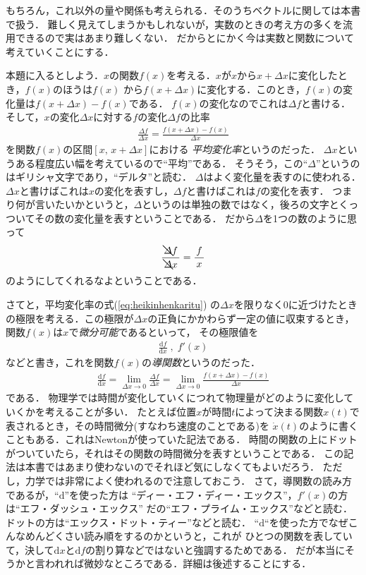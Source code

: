 もちろん，これ以外の量や関係も考えられる．そのうちベクトルに関しては本書で扱う．
難しく見えてしまうかもしれないが，実数のときの考え方の多くを流用できるので実はあまり難しくない．
だからとにかく今は実数と関数について考えていくことにする． 

本題に入るとしよう．$x$の関数$f(x)$を考える．$x$が$x$から$x + \varDelta x$に変化したとき，$f(x)$のほうは$f(x)$
から$f(x+ \varDelta x)$に変化する．このとき，$f(x)$の変化量は$f(x+\varDelta x )-f(x)$である．
$f(x)$の変化なのでこれは$\varDelta f$と書ける．
そして，$x$の変化$\varDelta x$に対する$f$の変化$\varDelta f$の比率
\begin{align}
\frac{\varDelta f}{\varDelta x} = \frac{f(x+\varDelta x)-f(x)}{\varDelta x}
\label{eq:heikinhenkaritu}
\end{align}
を関数$f(x)$の区間$[x, \, x+\varDelta x]$における
\emph{平均変化率}というのだった．
$\varDelta x$というある程度広い幅を考えているので``平均''である．
そうそう，この``$\varDelta$''というのはギリシャ文字であり，``デルタ''と読む．
$\varDelta$はよく変化量を表すのに使われる．$\varDelta x$と書けばこれは$x$の変化を表すし，$\varDelta f$と書けばこれは$f$の変化を表す．
つまり何が言いたいかというと，$\varDelta$というのは単独の数ではなく，後ろの文字とくっついてその数の変化量を表すということである．
だから$\varDelta$を1つの数のように思って
$$
\frac{\bcancel{\varDelta}f}{\bcancel{\varDelta}x} = \frac{f}{x}
$$
のようにしてくれるなよということである．

さてと，平均変化率の式(\ref{eq:heikinhenkaritu})
の$\varDelta x$を限りなく0に近づけたときの極限を考える．この極限が$\varDelta x$の正負にかかわらず一定の値に収束するとき，
関数$f(x)$は$x$で\emph{微分可能}であるといって，
その極限値を
\begin{align*}
\frac{\mathrm{d}f}{\mathrm{d}x} \; , \; f'(x)
\end{align*}
などと書き，これを関数$f(x)$の\emph{導関数}というのだった．
\begin{align}
\frac{\mathrm{d}f}{\mathrm{d}x} = \lim_{\varDelta x \to 0} \frac{\varDelta f}{\varDelta x} = 
\lim_{\varDelta x \to 0}\frac{f(x+\varDelta x)-f(x)}{\varDelta x}
\label{eq:bibunteigi}
\end{align}
である．
物理学では時間が変化していくにつれて物理量がどのように変化していくかを考えることが多い．
たとえば位置$x$が時間$t$によって決まる関数$x(t)$で表されるとき，その時間微分(すなわち速度のことである)を
$\dot{x}(t)$のように書くこともある．これはNewtonが使っていた記法である．
時間の関数の上にドットがついていたら，それはその関数の時間微分を表すということである．
この記法は本書ではあまり使わないのでそれほど気にしなくてもよいだろう．
ただし，力学では非常によく使われるので注意しておこう．
さて，導関数の読み方であるが，``$\mathrm{d}$''を使った方は
``ディー・エフ・ディー・エックス''，$f'(x)$の方は``エフ・ダッシュ・エックス''
だの``エフ・プライム・エックス''などと読む．ドットの方は``エックス・ドット・ティー''などと読む．
``$\mathrm{d}$``を使った方でなぜこんなめんどくさい読み順をするのかというと，これが
ひとつの関数を表していて，決して{$\mathrm{d} x$}と{$\mathrm{d} f$}の割り算などではないと強調するためである．
だが本当にそうかと言われれば微妙なところである．詳細は後述することにする．

